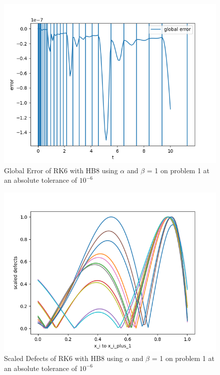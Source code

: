 \documentclass{article}
\begin{document}
\begin{figure}[H]
\centering
\includegraphics[width=0.7\linewidth]{./figures/static_alpha_rk6_with_hb8_p1_global_error}
\caption{Global Error of RK6 with HB8 using $\alpha$ and $\beta$ = 1 on problem 1 at an absolute tolerance of $10^{-6}$}
\label{fig:static_alpha_rk6_with_hb8_p1_global_error}
\end{figure}

\begin{figure}[H]
\centering
\includegraphics[width=0.7\linewidth]{./figures/static_alpha_rk6_with_hb8_p1_scaled_defects}
\caption{Scaled Defects of RK6 with HB8 using $\alpha$ and $\beta$ = 1 on problem 1 at an absolute tolerance of $10^{-6}$}
\label{fig:static_alpha_rk6_with_hb8_p1_scaled_defects}
\end{figure}
\end{document}
